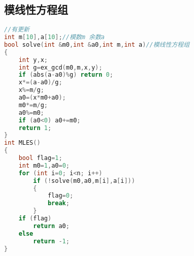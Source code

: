 \subsection{模线性方程组}
    \begin{lstlisting}[language=c++]
//有更新
int m[10],a[10];//模数m 余数a
bool solve(int &m0,int &a0,int m,int a)//模线性方程组
{
    int y,x;
    int g=ex_gcd(m0,m,x,y);
    if (abs(a-a0)%g) return 0;
    x*=(a-a0)/g;
    x%=m/g;
    a0=(x*m0+a0);
    m0*=m/g;
    a0%=m0;
    if (a0<0) a0+=m0;
    return 1;
}
int MLES()
{
    bool flag=1;
    int m0=1,a0=0;
    for (int i=0; i<n; i++)
        if (!solve(m0,a0,m[i],a[i]))
        {
            flag=0;
            break;
        }
    if (flag)
        return a0;
    else
        return -1;
}
    \end{lstlisting}